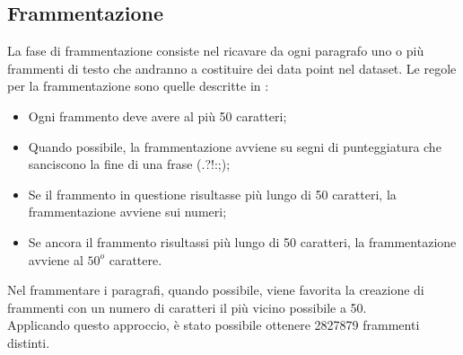 \documentclass[12pt]{article}
\begin{document}
\subsection{Frammentazione} \label{sec:spezzettamento}
La fase di frammentazione consiste nel ricavare da ogni paragrafo uno o più frammenti di testo che andranno a costituire dei data point nel dataset. Le regole per la frammentazione sono quelle descritte in  \cite{nematus}:
\begin{itemize}
\item Ogni frammento deve avere al più 50 caratteri;
\item Quando possibile, la frammentazione avviene su segni di punteggiatura che sanciscono la fine di una frase (.?!:;);
\item Se il frammento in questione risultasse più lungo di 50 caratteri, la frammentazione avviene sui numeri;
\item Se ancora il frammento risultassi più lungo di 50 caratteri, la frammentazione avviene al $50^o$ carattere.
\end{itemize}
Nel frammentare i paragrafi, quando possibile, viene favorita la creazione di frammenti con un numero di caratteri il più vicino possibile a 50.\\

Applicando questo approccio, è stato possibile ottenere 2827879 frammenti distinti.
\end{document}
